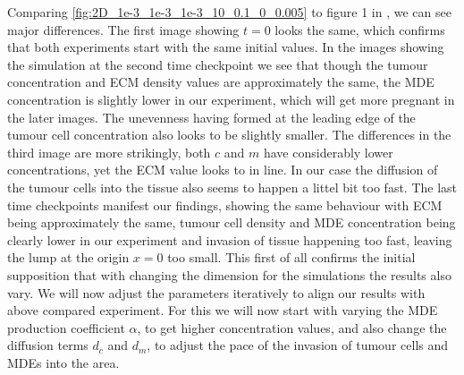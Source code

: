 Comparing \ref{fig:2D_1e-3_1e-3_1e-3_10_0.1_0_0.005} to figure 1 in \cite{anderson_mathematical_2000}, we can see major differences. The first image showing $t=0$ looks the same, which confirms that both experiments start with the same initial values. In the images showing the simulation at the second time checkpoint we see that though the tumour concentration and ECM density values are approximately the same, the MDE concentration is slightly lower in our experiment, which will get more pregnant in the later images. The unevenness having formed at the leading edge of the tumour cell concentration also looks to be slightly smaller. The differences in the third image are more strikingly, both $c$ and $m$ have considerably lower concentrations, yet the ECM value looks to in line. In our case the diffusion of the tumour cells into the tissue also seems to happen a littel bit too fast. The last time checkpoints manifest our findings, showing the same behaviour with ECM being approximately the same, tumour cell density and MDE concentration being clearly lower in our experiment and invasion of tissue happening too fast, leaving the lump at the origin $x=0$ too small. \newline 
This first of all confirms the initial supposition that with changing the dimension for the simulations the results also vary. We will now adjust the parameters iteratively to align our results with above compared experiment. For this we will now start with varying the MDE production coefficient $\alpha$, to get higher concentration values, and also change the diffusion terms $d_c$ and $d_m$, to adjust the pace of the invasion of tumour cells and MDEs into the area.

